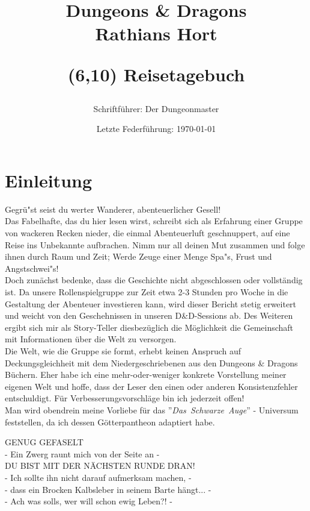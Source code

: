 \documentclass[11pt, openany]{article} %
\title{\fontsize{40pt}{42pt}\selectfont Dungeons \& Dragons \\
Rathians Hort
\author{Schriftf\"uhrer: Der Dungeonmaster}
\date{Letzte Federf\"uhrung: \today}
\begin{textblock}{4}(6,10)
\Huge Reisetagebuch
\end{textblock}
}
\begin{document}
\maketitle
\newpage
\tableofcontents
\newpage

\section{Einleitung}

Gegr\"u"st seist du werter Wanderer, abenteuerlicher Gesell!\\ Das Fabelhafte, das du hier lesen wirst, schreibt sich als Erfahrung einer Gruppe von wackeren Recken nieder, die einmal Abenteuerluft geschnuppert, auf eine Reise ins Unbekannte aufbrachen. Nimm nur all deinen Mut zusammen und folge ihnen durch Raum und Zeit; Werde Zeuge einer Menge Spa"s, Frust und Angstschwei"s!\\

Doch zun\"achst bedenke, dass die Geschichte nicht abgeschlossen oder vollst\"andig ist. Da unsere Rollenspielgruppe zur Zeit etwa 2-3 Stunden pro Woche in die Gestaltung der Abenteuer investieren kann, wird dieser Bericht stetig erweitert und weicht von den Geschehnissen in unseren D\&D-Sessions ab. Des Weiteren ergibt sich mir als Story-Teller diesbez\"uglich die M\"oglichkeit die Gemeinschaft mit Informationen \"uber die Welt zu versorgen. \\

Die Welt, wie die Gruppe sie formt, erhebt keinen Anspruch auf Deckungsgleichheit mit dem Niedergeschriebenen aus den Dungeons \& Dragons B\"uchern. Eher habe ich eine mehr-oder-weniger konkrete Vorstellung meiner eigenen Welt und hoffe, dass der Leser den einen oder anderen Konsistenzfehler entschuldigt. F\"ur Verbesserungsvorschl\"age bin ich jederzeit offen!\\

Man wird obendrein meine Vorliebe f\"ur das \mbox{''\textit{Das Schwarze Auge}''} - Universum feststellen, da ich dessen G\"otterpantheon adaptiert habe.\\

\begin{center}
    GENUG GEFASELT\\
    - Ein Zwerg raunt mich von der Seite an -\\
    DU BIST MIT DER N\"ACHSTEN RUNDE DRAN!\\
    - Ich sollte ihn nicht darauf aufmerksam machen, -\\
    - dass ein Brocken Kalbsleber in seinem Barte h\"angt... -\\
    - Ach was solls, wer will schon ewig Leben?! -
\end{center}
\end{document}
